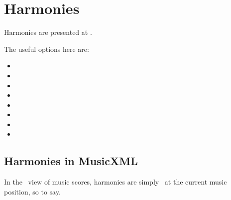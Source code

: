 



\chapter{Harmonies}\label{Harmonies}

Harmonies are presented at .

The useful options here are:
\begin{itemize}
\item {}
\item {}
\item {}
\item {}
\item {}
\item {}
\item {}
\item {}
\end{itemize}

\section{Harmonies in MusicXML}

In the \mxml\ view of music scores, harmonies are simply \drawn\ at the current music position, so to say.

